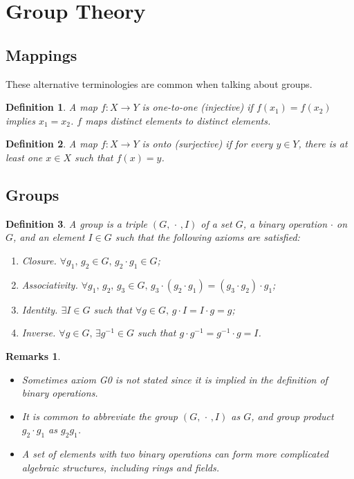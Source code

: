 \documentclass{article}
\theoremstyle{plain}\theoremheaderfont{\normalfont\itshape}\theorembodyfont{\rmfamily}\theoremseparator{.}\newtheorem*{rem}{Remark}\newtheorem*{ex}{Example}\newtheorem*{proof}{Proof}\newtheorem*{altp}{Alternative proof}
\theoremstyle{plain}\theoremheaderfont{\normalfont\bfseries}\theorembodyfont{\rmfamily}\theoremseparator{.}\newtheorem{thm}{Theorem}[section]\newtheorem{lem}[thm]{Lemma}\newtheorem{prop}[thm]{Proposition}\newtheorem*{cor}{Corollary}\newtheorem{defn}[thm]{Definition}\newtheorem{clm}[thm]{Claim}\newtheorem{clminproof}{Claim}
\theoremstyle{break}\theoremheaderfont{\normalfont\itshape}\theorembodyfont{\rmfamily}\theoremseparator{.\medskip}\newtheorem*{proofskip}{Proof}\newtheorem*{exs}{Examples}\newtheorem*{rems}{Remarks}
\theoremstyle{break}\theoremheaderfont{\normalfont\bfseries}\theorembodyfont{\rmfamily}\theoremseparator{.\medskip}\newtheorem{lemskip}[thm]{Lemma}\newtheorem{defnskip}[thm]{Definition}\newtheorem{propskip}[thm]{Proposition}\newtheorem{thmskip}[thm]{Theorem}
\numberwithin{equation}{section}
\begin{document}
	\newpage
	
	\section{Group Theory}
	\subsection{Mappings}
	These alternative terminologies are common when talking about groups.
	\begin{defn}
		A map \(f:X\rightarrow Y\) is \textit{one-to-one} (injective) if \(f(x_1)=f(x_2)\) implies \(x_1=x_2\). \(f\) maps distinct elements to distinct elements.
	\end{defn}
	\begin{defn}
		A map \(f:X\rightarrow Y\) is \textit{onto} (surjective) if for every \(y\in Y\), there is at least one \(x\in X\) such that \(f(x)=y\).
	\end{defn}
	\subsection{Groups}
	\begin{defn}
		A \textit{group} is a triple \((G,\,\cdot\,,I)\) of a set \(G\), a binary operation \(\cdot\) on \(G\), and an element \(I\in G\) such that the following axioms are satisfied:
		\begin{enumerate}[topsep=0pt,parsep=0.5em]
			\item[(G0)] \textit{Closure.} \(\forall g_1,\, g_2\in G, \, g_2\cdot g_1\in G\);
			\item[(G1)] \textit{Associativity.} \(\forall g_1,\, g_2,\, g_3\in G,\, g_3\cdot(g_2\cdot g_1)=(g_3\cdot g_2)\cdot g_1\);
			\item[(G2)] \textit{Identity.} \(\exists I\in G\) such that \(\forall g\in G,\,g\cdot I=I\cdot g=g\);
			\item[(G3)] \textit{Inverse.} \(\forall g\in G,\,\exists g^{-1}\in G\) such that \(g\cdot g^{-1}=g^{-1}\cdot g=I\).
		\end{enumerate}
	\end{defn}
	\begin{rems}
		\begin{itemize}[topsep=0pt]
			\item Sometimes axiom G0 is not stated since it is implied in the definition of binary operations.
			\item It is common to abbreviate the group \((G,\,\cdot\,,I)\) as \(G\), and group product \(g_2\cdot g_1\) as \(g_2g_1\).
			\item A set of elements with two binary operations can form more complicated algebraic structures, including \textit{rings} and \textit{fields}.
		\end{itemize}
	\end{rems}
			
\end{document}
